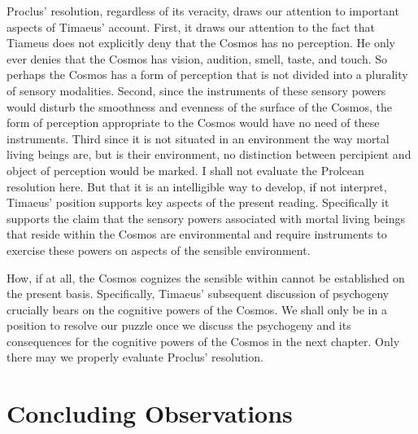 Proclus' resolution, regardless of its veracity, draws our attention to important aspects of Timaeus' account. First, it draws our attention to the fact that Tiameus does not explicitly deny that the Cosmos has no perception. He only ever denies that the Cosmos has vision, audition, smell, taste, and touch. So perhaps the Cosmos has a form of perception that is not divided into a plurality of sensory modalities. Second, since the instruments of these sensory powers would disturb the smoothness and evenness of the surface of the Cosmos, the form of perception appropriate to the Cosmos would have no need of these instruments. Third since it is not situated in an environment the way mortal living beings are, but is their environment, no distinction between percipient and object of perception would be marked. I shall not evaluate the Prolcean resolution here. But that it is an intelligible way to develop, if not interpret, Timaeus' position supports key aspects of the present reading. Specifically it supports the claim that the sensory powers associated with mortal living beings that reside within the Cosmos are environmental and require instruments to exercise these powers on aspects of the sensible environment.

How, if at all, the Cosmos cognizes the sensible within cannot be established on the present basis. Specifically, Timaeus' subsequent discussion of psychogeny crucially bears on the cognitive powers of the Cosmos. We shall only be in a position to resolve our puzzle once we discuss the psychogeny and its consequences for the cognitive powers of the Cosmos in the next chapter. Only there may we properly evaluate Proclus' resolution.


\section{Concluding Observations} %
\label{sec:concluding_observations_c}


